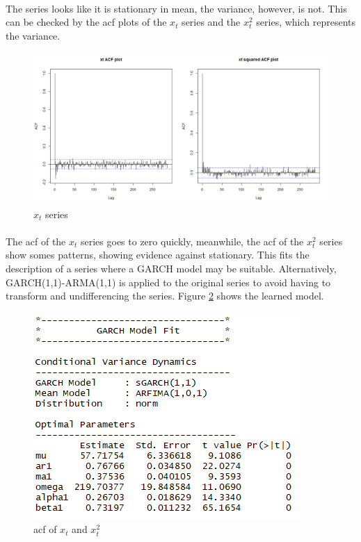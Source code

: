 \documentclass[12pt]{article}
\begin{document}
\paragraph{}
The series looks like it is stationary in mean, the variance, however, is not. This can be checked by the acf plots of the $x_t$ series and the $x_t^2$ series, which represents the variance.
\begin{figure}[H]
  \centering
  \includegraphics[width=\linewidth]{figure25.png}
  \caption{$x_t$ series}
  \label{fig:figure26}
\end{figure}

\paragraph{}
The acf of the $x_t$ series goes to zero quickly, meanwhile, the acf of the $x_t^2$ series show somes patterns, showing evidence against stationary. This fits the description of a series where a GARCH model may be suitable. Alternatively, GARCH(1,1)-ARMA(1,1) is applied to the original series to avoid having to transform and undifferencing the series. Figure \ref{fig:figure27} shows the learned model. 
\begin{figure}[H]
  \centering
  \includegraphics[width=0.5\linewidth]{figure26.png}
  \caption{acf of $x_t$ and $x_t^2$}
  \label{fig:figure27}
\end{figure}
\end{document}
